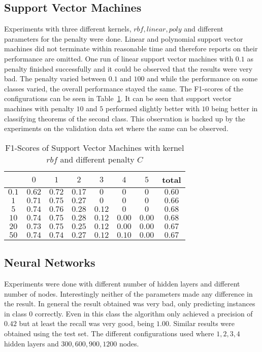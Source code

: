 \subsection{Support Vector Machines}
Experiments with three different kernels, $rbf,linear,poly$ and different parameters for the penalty were done. Linear and polynomial support vector machines did not terminate within reasonable time and therefore reports on their performance are omitted. One run of linear support vector machines with $0.1$ as penalty finished successfully and it could be observed that the results were very bad. The penalty varied between $0.1$ and $100$ and while the performance on some classes varied, the overall performance stayed the same. The F1-scores of the configurations can be seen in Table~\ref{ds2:table:svmf1}. It can be seen that support vector machines with penalty $10$ and $5$ performed slightly better with $10$ being better in classifying theorems of the second class. This observation is backed up by the experiments on the validation data set where the same can be observed.
\begin{table}[p]
	\begin{center}
		\begin{tabular}{|c|c|c|c|c|c|c|c|}
		\hline \backslashbox{$C$}{Class} & $0$ & $1$ & $2$ & $3$ &$4$  &$ 5$ & total \\
\hline $0.1$ & $0.62$ & $0.72$ & $0.17$ & $0$ & $0$ & $0$ & $0.60$ \\
\hline $1$ & $0.71$ & $0.75$ & $0.27$ & $0$ & $0$ & $0$ & $0.66$ \\
\hline $5$ & $0.74$ & $0.76$ &$0.28$ & $0.12$ & $0$ & $0$ & $0.68$ \\
\hline $10$ & $0.74$ & $0.75$ &$0.28$ & $0.12$ & $0.00$ &	$0.00$ & $0.68$ \\
\hline $20$ & $0.73$ & $0.75$ &$0.25$ & $0.12$ & $0.00$ & $0.00$ & $0.67$ \\
\hline $50$ & $0.74$ & $0.74$ &$0.27$ & $0.12$ & $0.10$ & $0.00$ & $0.67$ \\
\hline
	\end{tabular}
	\end{center}
	\caption{F1-Scores of Support Vector Machines with kernel $rbf$ and different penalty $C$\label{ds2:table:svmf1}}
\end{table}

\subsection{Neural Networks}
Experiments were done with different number of hidden layers and different number of nodes. Interestingly neither of the parameters made any difference in the result. In general the result obtained was very bad, only predicting instances in class $0$ correctly. Even in this class the algorithm only achieved a precision of $0.42$ but at least the recall was very good, being $1.00$. Similar results were obtained using the test set. The different configurations used where $1,2,3,4$ hidden layers and $300,600,900,1200$ nodes. 
